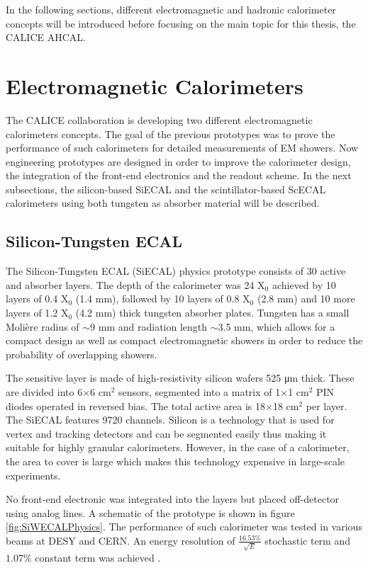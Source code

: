 In the following sections, different electromagnetic and hadronic calorimeter concepts will be introduced before focusing on the main topic for this thesis, the CALICE AHCAL.

\section{Electromagnetic Calorimeters}
\label{sec:EMCal}

The CALICE collaboration is developing two different electromagnetic calorimeters con\-cepts. The goal of the previous prototypes was to prove the performance of such ca\-lo\-ri\-me\-ters for detailed measurements of EM showers. Now engineering prototypes are designed in order to improve the calorimeter design, the integration of the front-end electronics and the readout scheme. In the next subsections, the silicon-based SiECAL and the scintillator-based ScECAL calorimeters using both tungsten as absorber material will be described.

\subsection{Silicon-Tungsten ECAL}

The Silicon-Tungsten ECAL (SiECAL) physics prototype \cite{1748-0221-3-08-P08001} consists of 30 active and absorber layers. The depth of the calorimeter was 24 X$_0$ achieved by 10 layers of 0.4 X$_0$ (1.4 mm), followed by 10 layers of 0.8 X$_0$ (2.8 mm) and 10 more layers of 1.2 X$_0$ (4.2 mm) thick tungsten absorber plates. Tungsten has a small Moli\`ere radius of $\sim$9 mm and radiation length $\sim$3.5 mm, which allows for a compact design as well as compact electromagnetic showers in order to reduce the probability of overlapping showers.

The sensitive layer is made of high-resistivity silicon wafers 525 \si{\micro\meter} thick. These are divided into 6$\times$6 cm$^2$ sensors, segmented into a matrix of 1$\times$1 cm$^2$ PIN diodes operated in reversed bias. The total active area is 18$\times$18 cm$^2$ per layer. The SiECAL features 9720 channels. Silicon is a technology that is used for vertex and tracking detectors and can be segmented easily thus making it suitable for highly granular calorimeters. However, in the case of a calorimeter, the area to cover is large which makes this technology expensive in large-scale experiments.

No front-end electronic was integrated into the layers but placed off-detector using analog lines. A schematic of the prototype is shown in figure \ref{fig:SiWECALPhysics}. The performance of such calorimeter was tested in various beams at DESY and CERN. An energy resolution of $\frac{16.53\%}{\sqrt{E}}$ stochastic term and $1.07\%$ constant term was achieved \cite{ADLOFF2009372}.

